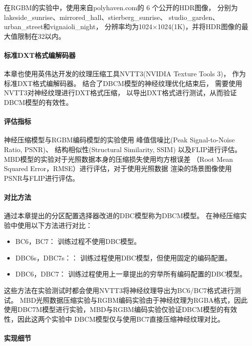在RGBM的实验中，使用来自polyhaven.com\cite{PolyHaven}的 6 个公开的HDR图像，
分别为lakeside\_sunrise、mirrored\_hall、stierberg\_sunrise、
studio\_garden、urban\_street和vignaioli\_night，
分辨率均为1024×1024(1K)，并将HDR图像的最大值限制在32以内。

\paragraph{标准DXT格式编解码器}

本章也使用英伟达开发的纹理压缩工具NVTT3\cite{NVTT3}(NVIDIA Texture Tools 3)，
作为标准DXT格式编解码器。
结合了DBCM模型的神经纹理优化结束后，
需要使用NVTT3对神经纹理进行DXT格式压缩，
以导出DXT格式进行测试，从而验证DBCM模型的有效性。

\paragraph{评估指标}

神经压缩模型与RGBM编码模型的实验使用
峰值信噪比(Peak Signal-to-Noise Ratio, PSNR)、
结构相似性\cite{wang2004image}(Structural Similarity, SSIM)
以及FLIP\cite{andersson2020flip}进行评估。
MBD模型的实验对于光照数据本身的压缩损失使用均方根误差
（Root Mean Squared Error，RMSE）进行评估，对于使用光照数据
渲染的场景图像使用PSNR与FLIP进行评估。

\paragraph{对比方法}

通过本章提出的分区配置选择器改进的DBC模型称为DBCM模型。
在神经压缩实验中使用以下方法进行对比：

\begin{itemize}
    \item BC6，BC7： 训练过程不使用DBC模型。
    \item DBC6s，DBC7s：： 训练过程使用DBC模型，但使用固定的编码配置。
    \item DBC6，DBC7： 训练过程使用上一章提出的穷举所有编码配置的DBC模型。    
\end{itemize}

这些方法在实验测试时都会使用NVTT3将神经纹理导出为BC6/BC7格式进行测试。
MBD光照数据压缩实验与RGBM编码实验由于神经纹理为RGBA格式，因此
使用DBC7M模型进行实验，MBD与RGBM编码实验仅验证DBCM模型的有效性，因此这两个实验中
DBCM模型仅与使用BC7直接压缩神经纹理对比。

\paragraph{实现细节}

